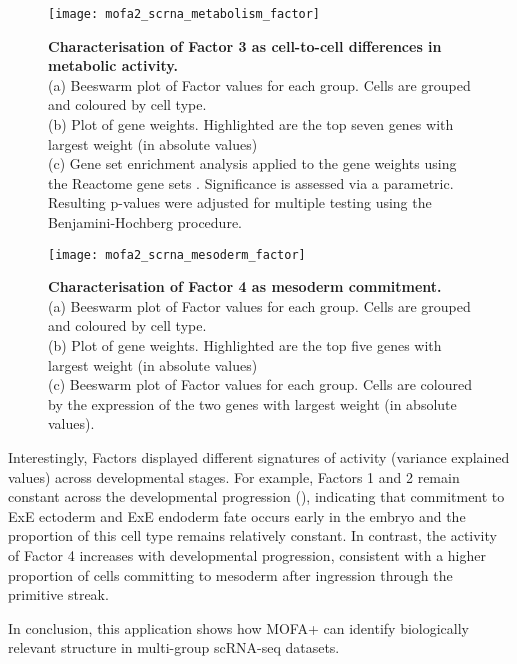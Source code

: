 \begin{figure}[H]
	\centering
	\texttt{[image: mofa2\_scrna\_metabolism\_factor]}
	\caption[]{\textbf{Characterisation of Factor 3 as cell-to-cell differences in metabolic activity.} \\
	(a) Beeswarm plot of Factor values for each group. Cells are grouped and coloured by cell type. \\
	(b) Plot of gene weights. Highlighted are the top seven genes with largest weight (in absolute values) \\
	(c) Gene set enrichment analysis applied to the gene weights using the Reactome gene sets \cite{Fabregat2015}. Significance is assessed via a parametric. Resulting p-values were adjusted for multiple testing using the Benjamini-Hochberg procedure.
	}
	\label{fig:mofa2_scrna_metabolism_factor}
\end{figure}

\begin{figure}[H]
	\centering
	\texttt{[image: mofa2\_scrna\_mesoderm\_factor]}
	\caption[]{\textbf{Characterisation of Factor 4 as mesoderm commitment.} \\
	(a) Beeswarm plot of Factor values for each group. Cells are grouped and coloured by cell type. \\
	(b) Plot of gene weights. Highlighted are the top five genes with largest weight (in absolute values) \\
	(c) Beeswarm plot of Factor values for each group. Cells are coloured by the expression of the two genes with largest weight (in absolute values).
	}
	\label{fig:mofa2_scrna_mesoderm_factor}
\end{figure} 


Interestingly, Factors displayed different signatures of activity (variance explained values) across developmental stages. For example, Factors 1 and 2 remain constant across the developmental progression (), indicating that commitment to ExE ectoderm and ExE endoderm fate occurs early in the embryo and the proportion of this cell type remains relatively constant. In contrast, the activity of Factor 4 increases with developmental progression, consistent with a higher proportion of cells committing to mesoderm after ingression through the primitive streak. 

In conclusion, this application shows how MOFA+ can identify biologically relevant structure in multi-group scRNA-seq datasets.

